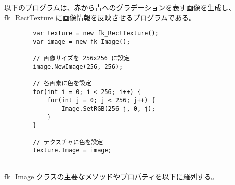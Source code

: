 以下のプログラムは、赤から青へのグラデーションを表す画像を生成し、
fk\_RectTexture に画像情報を反映させるプログラムである。
\\
\begin{breakbox}
\begin{verbatim}
        var texture = new fk_RectTexture();
        var image = new fk_Image();

        // 画像サイズを 256x256 に設定
        image.NewImage(256, 256);

        // 各画素に色を設定
        for(int i = 0; i < 256; i++) {
            for(int j = 0; j < 256; j++) {
                Image.SetRGB(256-j, 0, j);
            }
        }

        // テクスチャに色を設定
        texture.Image = image;
\end{verbatim}
\end{breakbox}
~ \\
fk\_Image クラスの主要なメソッドやプロパティを以下に羅列する。

